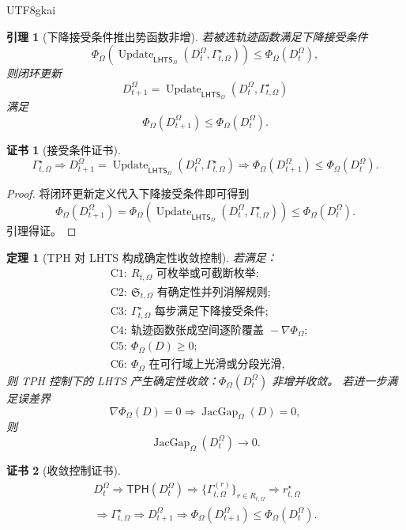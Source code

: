 \documentclass[12pt]{article}
\newtheorem{theorem}{定理}[section]
\newtheorem{lemma}{引理}[section]
\newtheorem{Certificate}{证书}[section]
\newcommand{\LHTS}{\ensuremath{\mathsf{LHTS}}}
\newcommand{\TPH}{\ensuremath{\mathsf{TPH}}}
\DeclareMathOperator{\JacGap}{JacGap}
\DeclareMathOperator{\Update}{Update}
\begin{document}
\begin{CJK*}{UTF8}{gkai}
\begin{lemma}[下降接受条件推出势函数非增]
若被选轨迹函数满足下降接受条件
\[
\Phi_\Omega\!\left(
\Update_{\LHTS_\Omega}(D_t^\Omega,\Gamma_{t,\Omega}^\star)
\right)
\le
\Phi_\Omega(D_t^\Omega),
\]
则闭环更新
\[
D_{t+1}^\Omega
=
\Update_{\LHTS_\Omega}(D_t^\Omega,\Gamma_{t,\Omega}^\star)
\]
满足
\[
\Phi_\Omega(D_{t+1}^\Omega)\le\Phi_\Omega(D_t^\Omega).
\]
\end{lemma}

\begin{Certificate}[接受条件证书]
\[
\boxed{
\Gamma_{t,\Omega}^\star
\Rightarrow
D_{t+1}^\Omega
=
\Update_{\LHTS_\Omega}(D_t^\Omega,\Gamma_{t,\Omega}^\star)
\Rightarrow
\Phi_\Omega(D_{t+1}^\Omega)\le\Phi_\Omega(D_t^\Omega).
}
\]
\end{Certificate}

\begin{proof}
将闭环更新定义代入下降接受条件即可得到
\[
\Phi_\Omega(D_{t+1}^\Omega)
=
\Phi_\Omega\!\left(
\Update_{\LHTS_\Omega}(D_t^\Omega,\Gamma_{t,\Omega}^\star)
\right)
\le
\Phi_\Omega(D_t^\Omega).
\]
引理得证。
\end{proof}

\begin{theorem}[TPH 对 LHTS 构成确定性收敛控制]
若满足：
\[
\begin{aligned}
&\mathrm{C1}:\ R_{t,\Omega}\text{ 可枚举或可截断枚举};\\
&\mathrm{C2}:\ \mathfrak S_{t,\Omega}\text{ 有确定性并列消解规则};\\
&\mathrm{C3}:\ \Gamma_{t,\Omega}^\star\text{ 每步满足下降接受条件};\\
&\mathrm{C4}:\ \text{轨迹函数张成空间逐阶覆盖 }-\nabla\Phi_\Omega;\\
&\mathrm{C5}:\ \Phi_\Omega(D)\ge0;\\
&\mathrm{C6}:\ \Phi_\Omega\text{ 在可行域上光滑或分段光滑},
\end{aligned}
\]
则 TPH 控制下的 LHTS 产生确定性收敛：\(\Phi_\Omega(D_t^\Omega)\) 非增并收敛。
若进一步满足误差界
\[
\nabla\Phi_\Omega(D)=0
\Longrightarrow
\JacGap_\Omega(D)=0,
\]
则
\[
\boxed{
\JacGap_\Omega(D_t^\Omega)\to0.
}
\]
\end{theorem}

\begin{Certificate}[收敛控制证书]
\[
\boxed{
\begin{gathered}
D_t^\Omega
\Rightarrow
\TPH(D_t^\Omega)
\Rightarrow
\{\Gamma_{t,\Omega}^{(r)}\}_{r\in R_{t,\Omega}}
\Rightarrow
r_{t,\Omega}^\star
\\
\Rightarrow
\Gamma_{t,\Omega}^\star
\Rightarrow
D_{t+1}^\Omega
\Rightarrow
\Phi_\Omega(D_{t+1}^\Omega)
\le
\Phi_\Omega(D_t^\Omega).
\end{gathered}
}
\]
\end{Certificate}


\end{CJK*}
\end{document}
